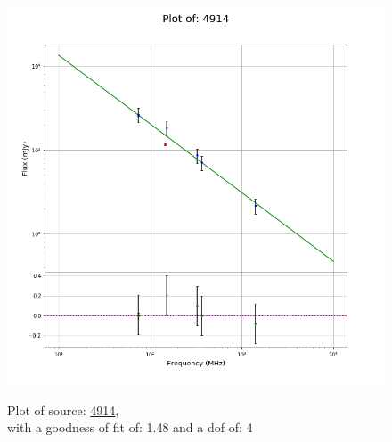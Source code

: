 \documentclass{article}
\begin{document}
\begin{figure}[H]
    \centering
    \begin{minipage}{.5\textwidth}
        \centering
        \includegraphics[scale = 0.35]{KmeulenSimSource_1hr/1hr4914.png}
        \captionsetup{labelformat=empty}
        \caption{Plot of source: \href{http://banana.transientskp.org/r4/vlo_KmeulenSimSource/runningcatalog/4914}{4914},\\with a goodness of fit of: 1.48 and a dof of: 4}
        \addtocounter{figure}{-1}
        \label{KmeulenSimSource:1hr:4914:plot}
    \end{minipage}%
    \begin{minipage}{0.5\textwidth}
        \centering


\end{minipage}
\end{figure}
\end{document}
